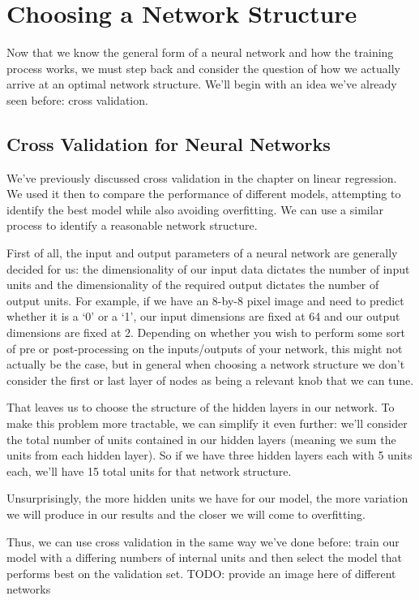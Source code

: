 \section{Choosing a Network Structure}
Now that we know the general form of a neural network and how the training process works, we must step back and consider the question of how we actually arrive at an optimal network structure. We'll begin with an idea we've already seen before: cross validation.

\subsection{Cross Validation for Neural Networks}
We've previously discussed cross validation in the chapter on linear regression. We used it then to compare the performance of different models, attempting to identify the best model while also avoiding overfitting. We can use a similar process to identify a reasonable network structure.

First of all, the input and output parameters of a neural network are generally decided for us: the dimensionality of our input data dictates the number of input units and the dimensionality of the required output dictates the number of output units. For example, if we have an 8-by-8 pixel image and need to predict whether it is a `0' or a `1', our input dimensions are fixed at 64 and our output dimensions are fixed at 2. Depending on whether you wish to perform some sort of pre or post-processing on the inputs/outputs of your network, this might not actually be the case, but in general when choosing a network structure we don't consider the first or last layer of nodes as being a relevant knob that we can tune.

That leaves us to choose the structure of the hidden layers in our network. To make this problem more tractable, we can simplify it even further: we'll consider the total number of units contained in our hidden layers (meaning we sum the units from each hidden layer). So if we have three hidden layers each with 5 units each, we'll have 15 total units for that network structure.

Unsurprisingly, the more hidden units we have for our model, the more variation we will produce in our results and the closer we will come to overfitting.

Thus, we can use cross validation in the same way we've done before: train our model with a differing numbers of internal units and then select the model that performs best on the validation set. TODO: provide an image here of different networks


